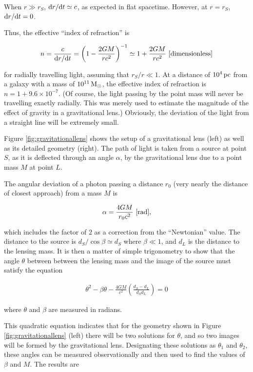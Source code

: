 \documentclass[a4paper,10pt]{article}
\begin{document}
{\noindent}When $r\gg r_S$, ${\rm d}r/{\rm d}t\simeq c$, as expected in flat spacetime. However, at $r=r_S$, ${\rm d}r/{\rm d}t=0$.

{\noindent}Thus, the effective ``index of refraction'' is

\begin{align*}
    n = \frac{c}{{\rm d}r/{\rm d}t} = \left(1-\frac{2GM}{rc^2}\right)^{-1} \simeq 1+ \frac{2GM}{rc^2} ~ [{\rm dimensionless}]
\end{align*}

{\noindent}for radially travelling light, assuming that $r_S/r\ll1$. At a distance of $10^4\,{\rm pc}$ from a galaxy with a mass of $10^{11}\,{\rm M_\odot}$, the effective index of refraction is $n=1+9.6\times10^{-7}$. (Of course, the light passing by the point mass will never be travelling exactly radially. This was merely used to estimate the magnitude of the effect of gravity in a gravitational lens.) Obviously, the deviation of the light from a straight line will be extremely small. 

{\noindent}Figure \ref{fig:gravitationallens} shows the setup of a gravitational lens (left) as well as its detailed geometry (right). The path of light is taken from a source at point $S$, as it is deflected through an angle $\alpha$, by the gravitational lens due to a point mass $M$ at point $L$.

{\noindent}The angular deviation of a photon passing a distance $r_0$ (very nearly the distance of closest approach) from a mass $M$ is

\begin{align*}
    \alpha = \frac{4GM}{r_0c^2} ~ [{\rm rad}],
\end{align*}

{\noindent}which includes the factor of $2$ as a correction from the ``Newtonian'' value. The distance to the source is $d_S/\cos\beta\simeq d_S$ where $\beta\ll1$, and $d_L$ is the distance to the lensing mass. It is then a matter of simple trigonometry to show that the angle $\theta$ between between the lensing mass and the image of the source must satisfy the equation

\begin{align*}
    \theta^2 - \beta\theta - \frac{4GM}{c^2} \left(\frac{d_S-d_L}{d_Sd_L}\right) = 0
\end{align*}

{\noindent}where $\theta$ and $\beta$ are measured in radians.

{\noindent}This quadratic equation indicates that for the geometry shown in Figure \ref{fig:gravitationallens} (left) there will be two solutions for $\theta$, and so two images will be formed by the gravitational lens. Designating these solutions as $\theta_1$ and $\theta_2$, these angles can be measured observationally and then used to find the values of $\beta$ and $M$. The results are
\end{document}

